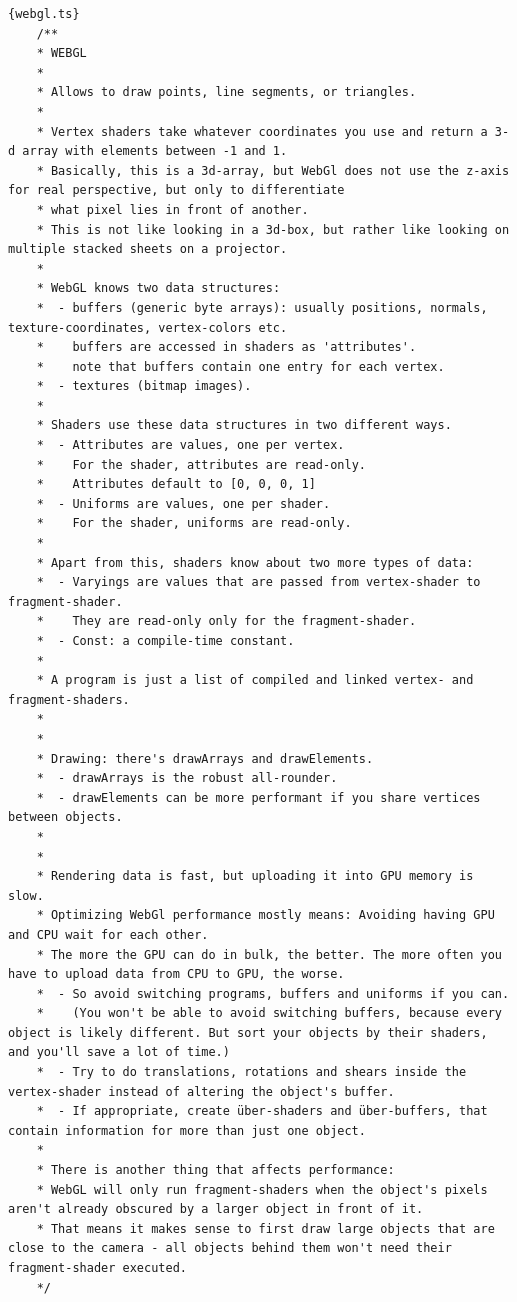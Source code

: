 \begin{lstlisting}{webgl.ts}
    /**
    * WEBGL
    *
    * Allows to draw points, line segments, or triangles.
    *
    * Vertex shaders take whatever coordinates you use and return a 3-d array with elements between -1 and 1.
    * Basically, this is a 3d-array, but WebGl does not use the z-axis for real perspective, but only to differentiate
    * what pixel lies in front of another.
    * This is not like looking in a 3d-box, but rather like looking on multiple stacked sheets on a projector.
    *
    * WebGL knows two data structures:
    *  - buffers (generic byte arrays): usually positions, normals, texture-coordinates, vertex-colors etc.
    *    buffers are accessed in shaders as 'attributes'.
    *    note that buffers contain one entry for each vertex.
    *  - textures (bitmap images).
    *
    * Shaders use these data structures in two different ways.
    *  - Attributes are values, one per vertex.
    *    For the shader, attributes are read-only.
    *    Attributes default to [0, 0, 0, 1]
    *  - Uniforms are values, one per shader.
    *    For the shader, uniforms are read-only.
    *
    * Apart from this, shaders know about two more types of data:
    *  - Varyings are values that are passed from vertex-shader to fragment-shader.
    *    They are read-only only for the fragment-shader.
    *  - Const: a compile-time constant.
    *
    * A program is just a list of compiled and linked vertex- and fragment-shaders.
    *
    *
    * Drawing: there's drawArrays and drawElements.
    *  - drawArrays is the robust all-rounder.
    *  - drawElements can be more performant if you share vertices between objects.
    *
    *
    * Rendering data is fast, but uploading it into GPU memory is slow.
    * Optimizing WebGl performance mostly means: Avoiding having GPU and CPU wait for each other.
    * The more the GPU can do in bulk, the better. The more often you have to upload data from CPU to GPU, the worse.
    *  - So avoid switching programs, buffers and uniforms if you can.
    *    (You won't be able to avoid switching buffers, because every object is likely different. But sort your objects by their shaders, and you'll save a lot of time.)
    *  - Try to do translations, rotations and shears inside the vertex-shader instead of altering the object's buffer.
    *  - If appropriate, create über-shaders and über-buffers, that contain information for more than just one object.
    *
    * There is another thing that affects performance:
    * WebGL will only run fragment-shaders when the object's pixels aren't already obscured by a larger object in front of it.
    * That means it makes sense to first draw large objects that are close to the camera - all objects behind them won't need their fragment-shader executed.
    */
   

\end{lstlisting}
